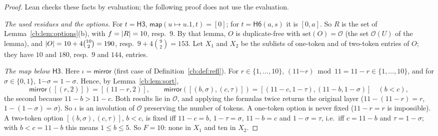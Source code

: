 \begin{proof}
Lean checks these facts by evaluation; the following proof does not use the evaluation.

\emph{The used residues and the options.} For $t=\mathsf{H3}$, $\mathsf{map}(u\mapsto u.1,t)=[0]$; for
$t=\mathsf{H6}(a,s)$ it is $[0,a]$. So $R$ is the set of Lemma~\ref{cb:lem:options}(b), with $f=\lvert R\rvert=10$, resp.\
$9$. By that lemma, $O$ is duplicate-free with $\mathrm{set}(O)=\mathcal O$ (the set $\mathcal O(U)$ of the lemma),
and $\lvert O\rvert=10+4\binom{10}2=190$, resp.\ $9+4\binom92=153$. Let $X_1$ and $X_2$ be the sublists of one-token and of
two-token entries of $O$; they have $10$ and $180$, resp.\ $9$ and $144$, entries.

\emph{The map below $\mathsf{H3}$.} Here $\iota=\mathsf{mirror}$ (first case of Definition~\ref{cb:def:refl}). For
$r\in\{1,\dots,10\}$, $(11\mathbin{\dot-}r)\bmod11=11-r\in\{1,\dots,10\}$, and for $\sigma\in\{0,1\}$,
$1\mathbin{\dot-}\sigma=1-\sigma$. Hence, by Lemma~\ref{cb:lem:sort},
\[
\mathsf{mirror}([(r,2)])=[(11-r,2)],\qquad
\mathsf{mirror}([(b,\sigma),(c,\tau)])=[(11-c,1-\tau),(11-b,1-\sigma)]\quad(b<c),
\]
the second because $11-b>11-c$. Both results lie in $\mathcal O$, and applying the formulas twice returns the original
layer ($11-(11-r)=r$, $1-(1-\sigma)=\sigma$). So $\iota$ is an involution of $\mathcal O$ preserving the number of
tokens. A one-token option is never fixed ($11-r=r$ is impossible). A two-token option $[(b,\sigma),(c,\tau)]$, $b<c$,
is fixed iff $11-c=b$, $1-\tau=\sigma$, $11-b=c$ and $1-\sigma=\tau$, i.e.\ iff $c=11-b$ and $\tau=1-\sigma$; with
$b<c=11-b$ this means $1\le b\le5$. So $F=10$: none in $X_1$ and ten in $X_2$.


\end{proof}
